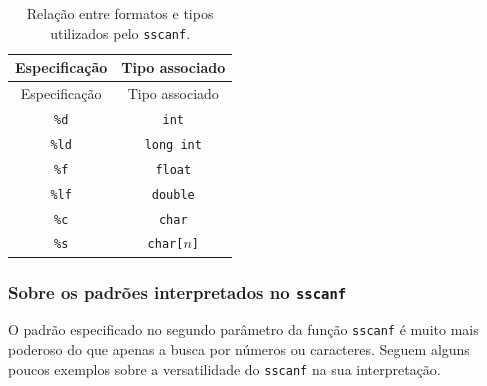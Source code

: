 \documentclass[
  11pt,
  a4paper,
]{scrbook}
\begin{document}
\begin{longtable}[]{@{}cc@{}}
\caption{Relação entre formatos e tipos utilizados pelo
\texttt{sscanf}.}\label{tbl-formatos-sscanf}\tabularnewline
\toprule\noalign{}
Especificação & Tipo associado \\
\midrule\noalign{}
\endfirsthead
\toprule\noalign{}
Especificação & Tipo associado \\
\midrule\noalign{}
\endhead
\bottomrule\noalign{}
\endlastfoot
\texttt{\%d} & \texttt{int} \\
\texttt{\%ld} & \texttt{long\ int} \\
\texttt{\%f} & \texttt{float} \\
\texttt{\%lf} & \texttt{double} \\
\texttt{\%c} & \texttt{char} \\
\texttt{\%s} & \texttt{char{[}}\(n\)\texttt{{]}} \\
\end{longtable}

\subsubsection{\texorpdfstring{Sobre os padrões interpretados no
\texttt{sscanf}}{Sobre os padrões interpretados no sscanf}}\label{sobre-os-padruxf5es-interpretados-no-sscanf}

O padrão especificado no segundo parâmetro da função \texttt{sscanf} é
muito mais poderoso do que apenas a busca por números ou caracteres.
Seguem alguns poucos exemplos sobre a versatilidade do \texttt{sscanf}
na sua interpretação.
\end{document}
